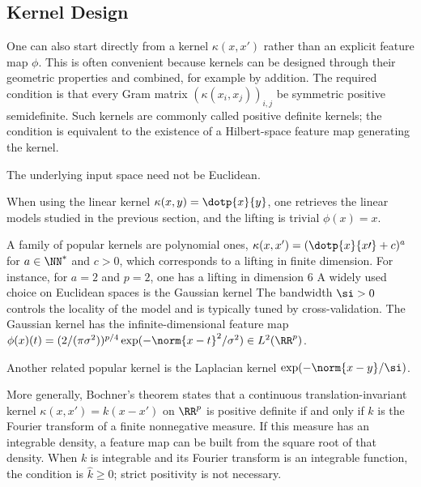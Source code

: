                                                  
\subsection{Kernel Design}

One can also start directly from a kernel $\kappa(x,x')$ rather than an explicit feature map $\phi$. This is often convenient because kernels can be designed through their geometric properties and combined, for example by addition. The required condition is that every Gram matrix $(\kappa(x_i,x_j))_{i,j}$ be symmetric positive semidefinite. Such kernels are commonly called positive definite kernels; the condition is equivalent to the existence of a Hilbert-space feature map generating the kernel.
 
The underlying input space need not be Euclidean.


When using the linear kernel $\kappa(x,y)=\dotp{x}{y}$, one retrieves the linear models studied in the previous section, and the lifting is trivial $\phi(x)=x$.
 
A family of popular kernels are polynomial ones,  $\kappa(x,x') = (\dotp{x}{x\prime}+c)^a$ for $a
\in \NN^*$ and $c>0$, which corresponds to a lifting in finite dimension. For instance, for $a=2$ and $p=2$, one has a lifting in dimension $6$
A widely used choice on Euclidean spaces is the Gaussian kernel
The bandwidth $\si>0$ controls the locality of the model and is typically tuned by cross-validation. The Gaussian kernel has the infinite-dimensional feature map $\phi(x)(t)=(2/(\pi\sigma^2))^{p/4}\exp(-\norm{x-t}^2/\sigma^2)\in L^2(\RR^p)$.
 
Another related popular kernel is the Laplacian kernel $\exp(-\norm{x-y}/\si)$.
 
More generally, Bochner's theorem states that a continuous translation-invariant kernel $\kappa(x,x')=k(x-x')$ on $\RR^p$ is positive definite if and only if $k$ is the Fourier transform of a finite nonnegative measure. If this measure has an integrable density, a feature map can be built from the square root of that density. When $k$ is integrable and its Fourier transform is an integrable function, the condition is $\hat k\geq0$; strict positivity is not necessary.
 

